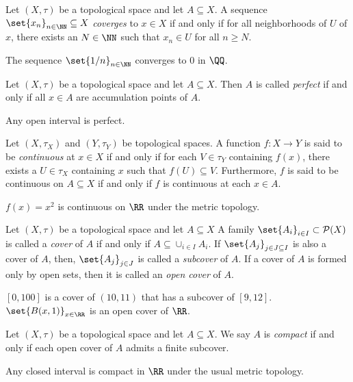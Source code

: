 \begin{definition*}
	Let $(X,\tau)$ be a topological space and let $A\subseteq X$.
	A sequence $\set{x_n}_{n\in\NN}\subseteq X$ \textit{coverges} to $x\in X$ if and only if for all neighborhoods of $U$ of $x$, there exists an $N\in\NN$ such that $x_n\in U$ for all $n\geq N$. 
\end{definition*}
\begin{example*}
	The sequence $\set{1/n}_{n\in\NN}$ converges to $0$ in $\QQ$.
\end{example*}

\begin{definition*}
	Let $(X,\tau)$ be a topological space and let $A\subseteq X$.
	Then $A$ is called \textit{perfect} if and only if all $x\in A$ are accumulation points of $A$.
\end{definition*}
\begin{example*}
	Any open interval is perfect.
\end{example*}

\begin{definition*}
	Let $(X,\tau_X)$ and $(Y,\tau_Y)$ be topological spaces.
	A function $f:X\rightarrow Y$ is said to be \textit{continuous} at $x\in X$ if and only if for each $V\in\tau_Y$ containing $f(x)$, there exists a $U\in\tau_X$ containing $x$ such that $f(U)\subseteq V$.
	Furthermore, $f$ is said to be continuous on $A\subseteq X$ if and only if $f$ is continuous at each $x\in A$.
\end{definition*}
\begin{example*}
	$f(x)=x^2$ is continuous on $\RR$ under the metric topology.
\end{example*}

\begin{definition*}
	Let $(X,\tau)$ be a topological space and let $A\subseteq X$
	A family $\set{A_i}_{i\in I}\subset \mathcal{P}(X)$ is called a \textit{cover} of $A$ if and only if $A\subseteq\cup_{i\in I} A_i$.
	If $\set{A_j}_{j\in J\subseteq I}$ is also a cover of $A$, then, $\set{A_j}_{j\in J}$ is called a \textit{subcover} of $A$.
	If a cover of $A$ is formed only by open sets, then it is called an \textit{open cover} of $A$.
\end{definition*}
\begin{example*}
	$[0,100]$ is a cover of $(10,11)$ that has a subcover of $[9,12]$.
	$\set{B(x,1)}_{x\in\RR}$ is an open cover of $\RR$.
\end{example*}

\begin{definition*}
	Let $(X,\tau)$ be a topological space and let $A\subseteq X$.
	We say $A$ is \textit{compact} if and only if each open cover of $A$ admits a finite subcover.
\end{definition*}
\begin{example*}
	Any closed interval is compact in $\RR$ under the usual metric topology.
\end{example*}

